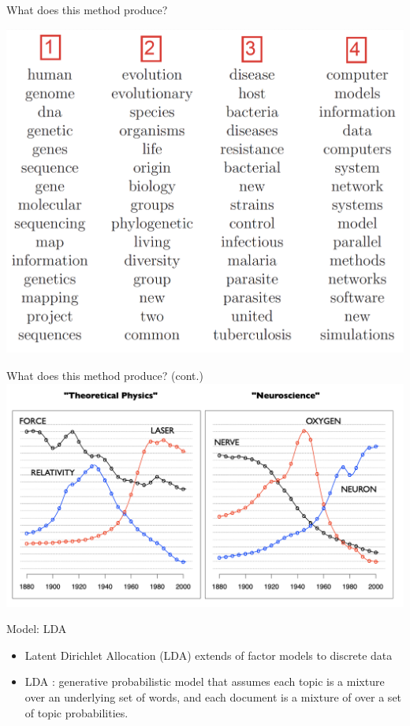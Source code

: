 \documentclass[english]{beamer}
\begin{document}
\begin{frame}{What does this method produce?}
\begin{center}
\includegraphics[width=0.9 \textwidth]{Images/topics_output.png}
\end{center}
\end{frame}
\begin{frame}{What does this method produce? (cont.)}
\centering
\includegraphics[width=1 \textwidth]{Images/plots.png}    
\end{frame}
\begin{frame}{Model: LDA}
\begin{itemize}
        \setlength{\itemsep}{1.2em}
    \item Latent Dirichlet Allocation (LDA) extends of factor models to discrete data
\item  LDA : generative probabilistic model that assumes each topic is a mixture over an underlying set of words, and each document is a mixture of over a set of topic probabilities.
\end{itemize}
\end{frame}
\end{document}
